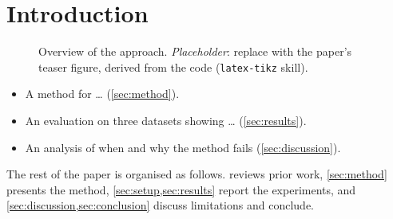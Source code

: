 \section{Introduction}\label{sec:intro}



\begin{figure}[t]
  \centering
  
  \caption{Overview of the approach. \emph{Placeholder}: replace with the paper's teaser figure, derived from the code (\texttt{latex-tikz} skill).}
  \label{fig:overview}
\end{figure}


\begin{itemize}
  \item A method for \dots{} (\cref{sec:method}).
  \item An evaluation on three datasets showing \dots{} (\cref{sec:results}).
  \item An analysis of when and why the method fails (\cref{sec:discussion}).
\end{itemize}

The rest of the paper is organised as follows.
 reviews prior work, \cref{sec:method} presents the method, \cref{sec:setup,sec:results} report the experiments, and \cref{sec:discussion,sec:conclusion} discuss limitations and conclude.
